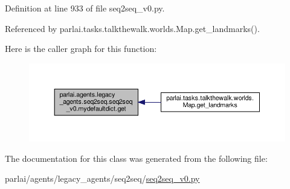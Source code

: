 Definition at line 933 of file seq2seq\+\_\+v0.\+py.



Referenced by parlai.\+tasks.\+talkthewalk.\+worlds.\+Map.\+get\+\_\+landmarks().

Here is the caller graph for this function\+:
\nopagebreak
\begin{figure}[H]
\begin{center}
\leavevmode
\includegraphics[width=350pt]{classparlai_1_1agents_1_1legacy__agents_1_1seq2seq_1_1seq2seq__v0_1_1mydefaultdict_a189be974031427bf68e4691307e2f2c2_icgraph}
\end{center}
\end{figure}


The documentation for this class was generated from the following file\+:\begin{DoxyCompactItemize}
\item 
parlai/agents/legacy\+\_\+agents/seq2seq/\hyperlink{seq2seq__v0_8py}{seq2seq\+\_\+v0.\+py}\end{DoxyCompactItemize}

